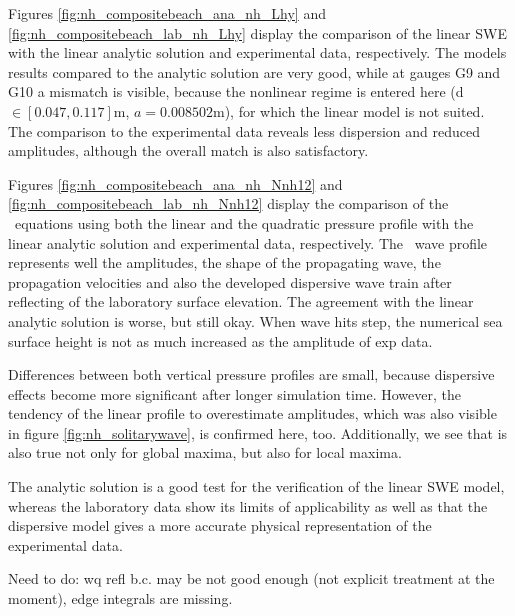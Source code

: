 Figures \eqref{fig:nh_compositebeach_ana_nh_Lhy} and \eqref{fig:nh_compositebeach_lab_nh_Lhy} display the comparison of the linear SWE with the linear analytic solution and experimental data, respectively.
The models results compared to the analytic solution are very good, while at gauges G9 and G10 a mismatch is visible, because the nonlinear regime is entered here (d $\in [0.047,0.117]$m, $a=0.008502$m), for which the linear model is not suited.
The comparison to the experimental data reveals less dispersion and reduced amplitudes, although the overall match is also satisfactory.

Figures \eqref{fig:nh_compositebeach_ana_nh_Nnh12} and \eqref{fig:nh_compositebeach_lab_nh_Nnh12} display the comparison of the \nh\ equations using both the linear and the quadratic pressure profile with the linear analytic solution and experimental data, respectively. The \nh\ wave profile represents well the amplitudes, the shape of the propagating wave, the propagation velocities and also the developed dispersive wave train after reflecting of the laboratory surface elevation. The agreement with the linear analytic solution is worse, but still okay.
When wave hits step, the numerical sea surface height is not as much increased as the amplitude of exp data. 

Differences between both vertical pressure profiles are small, because dispersive effects become more significant after longer simulation time. However, the tendency of the linear profile to overestimate amplitudes, which was also visible in figure \ref{fig:nh_solitarywave}, is confirmed here, too. Additionally, we see that is also true not only for global maxima, but also for local maxima.

The analytic solution is a good test for the verification of the linear SWE model, whereas the laboratory data show its limits of applicability as well as that the dispersive model gives a more accurate physical representation of the experimental data.

Need to do: wq refl b.c. may be not good enough (not explicit treatment at the moment), edge integrals are missing.


